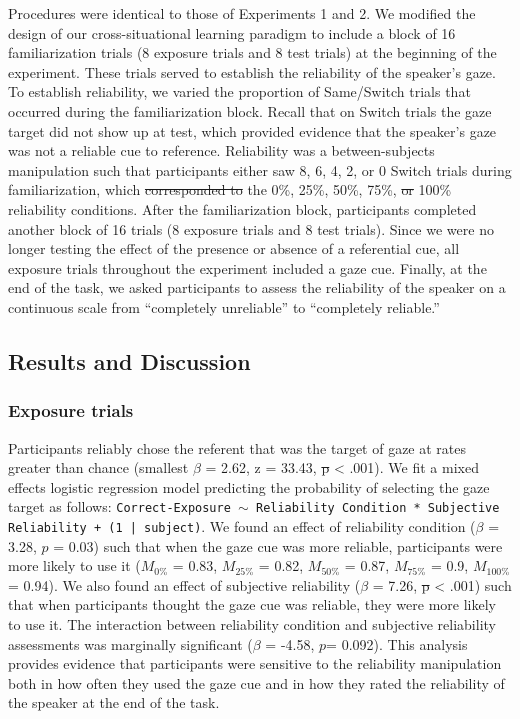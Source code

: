 \documentclass[authoryear, review]{elsarticle}
\providecommand{\DIFaddtex}[1]{{\protect\color{blue}\uwave{#1}}} %
\providecommand{\DIFdeltex}[1]{{\protect\color{red}\sout{#1}}}                      %
\providecommand{\DIFaddbegin}{} %
\providecommand{\DIFaddend}{} %
\providecommand{\DIFdelbegin}{} %
\providecommand{\DIFdelend}{} %
\providecommand{\DIFadd}[1]{\texorpdfstring{\DIFaddtex{#1}}{#1}} %
\providecommand{\DIFdel}[1]{\texorpdfstring{\DIFdeltex{#1}}{}} %
\begin{document}
Procedures were identical to those of Experiments 1 and 2. We modified
the design of our cross-situational learning paradigm to include a block
of 16 familiarization trials (8 exposure trials and 8 test trials) at
the beginning of the experiment. These trials served to establish the
reliability of the speaker's gaze. To establish reliability, we varied
the proportion of Same/Switch trials that occurred during the
familiarization block. Recall that on Switch trials the gaze target did
not show up at test, which provided evidence that the speaker's gaze was
not a reliable cue to reference. Reliability was a between-subjects
manipulation such that participants either saw 8, 6, 4, 2, or 0 Switch
trials during familiarization, which \DIFdelbegin \DIFdel{corresponded to }\DIFdelend \DIFaddbegin \DIFadd{created }\DIFaddend the 0\%, 25\%, 50\%, 75\%,
\DIFdelbegin \DIFdel{or }\DIFdelend \DIFaddbegin \DIFadd{and }\DIFaddend 100\% reliability conditions. After the familiarization block,
participants completed another block of 16 trials (8 exposure trials and
8 test trials). Since we were no longer testing the effect of the
presence or absence of a referential cue, all exposure trials throughout
the experiment included a gaze cue. Finally, at the end of the task, we
asked participants to assess the reliability of the speaker on a
continuous scale from ``completely unreliable'' to ``completely
reliable.''

\subsection{Results and Discussion}\label{results-and-discussion-2}

\subsubsection{Exposure trials}\label{exposure-trials-2}

Participants reliably chose the referent that was the target of gaze at
rates greater than chance (smallest \(\beta\) = 2.62, z = 33.43, \DIFdelbegin \DIFdel{p
}\DIFdelend \DIFaddbegin \DIFadd{\(p\)
}\DIFaddend \textless{} .001). We fit a mixed effects logistic regression model
predicting the probability of selecting the gaze target as follows:
\texttt{Correct-Exposure $\sim$ Reliability Condition * Subjective Reliability + (1 | subject)}.
We found an effect of reliability condition (\(\beta\) = 3.28, \(p\) =
0.03) such that when the gaze cue was more reliable, participants were
more likely to use it (\(M_{0\%}\) = 0.83, \(M_{25\%}\) = 0.82,
\(M_{50\%}\) = 0.87, \(M_{75\%}\) = 0.9, \(M_{100\%}\) = 0.94). We also
found an effect of subjective reliability (\(\beta\) = 7.26, \DIFdelbegin \DIFdel{p
}\DIFdelend \DIFaddbegin \DIFadd{\(p\)
}\DIFaddend \textless{} .001) such that when participants thought the gaze cue was
reliable, they were more likely to use it. The interaction between
reliability condition and subjective reliability assessments was
marginally significant (\(\beta\) = -4.58, \(p\)= 0.092). This analysis
provides evidence that participants were sensitive to the reliability
manipulation both in how often they used the gaze cue and in how they
rated the reliability of the speaker at the end of the task.
\end{document}
